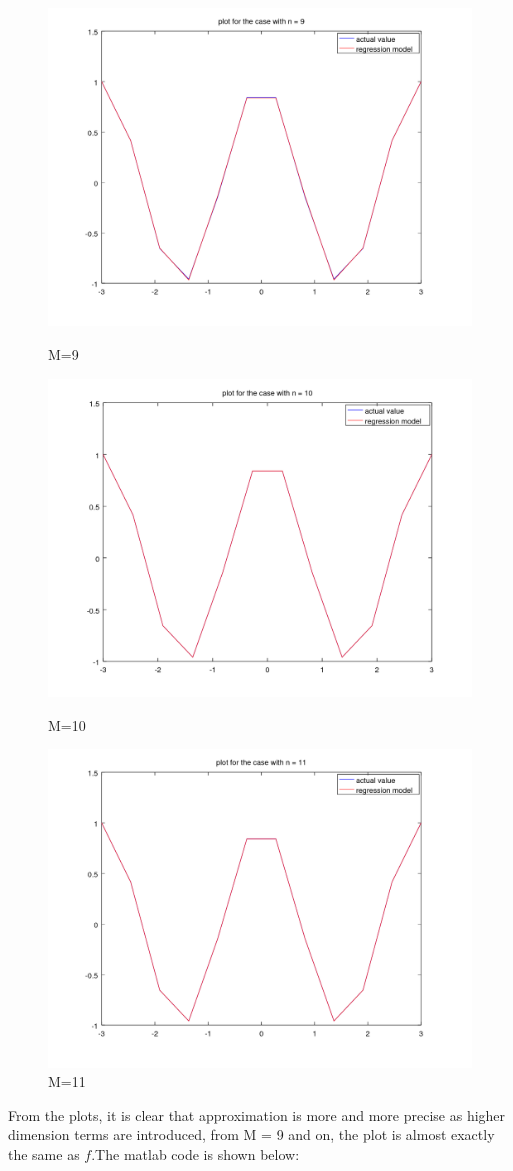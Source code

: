 \documentclass[11pt]{article}
\theoremstyle{plain}
\theoremstyle{definition}
\begin{document}
\begin{figure}[!htb]
   \begin{minipage}{0.48\textwidth}
     \centering
     \includegraphics[width=.7\linewidth]{hw1_task6_fig9.png}
     \caption{M=9}\label{Fig:M=9}
   \end{minipage}\hfill
   \begin {minipage}{0.48\textwidth}
     \centering
     \includegraphics[width=.7\linewidth]{hw1_task6_fig10.png}
     \caption{M=10}\label{Fig:M=10}
   \end{minipage}\hfill
   \begin {minipage}{0.48\textwidth}
     \centering
     \includegraphics[width=.7\linewidth]{hw1_task6_fig11.png}
     \caption{M=11}\label{Fig:M=11}
   \end{minipage}
\end{figure}
From the plots, it is clear that approximation is more and more precise as higher dimension terms are introduced, from M = 9 and on, the plot is almost exactly the same as $f$.The matlab code is shown below: 

\end{document}
